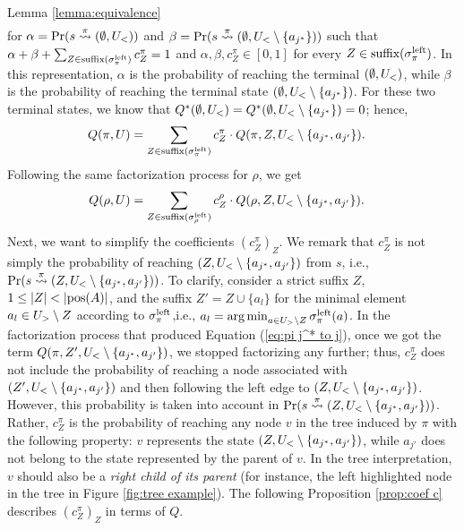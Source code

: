 \begin{proofof}{Lemma \ref{lemma:equivalence}}
\begin{align*}
\end{align*}
for $\alpha=\Pr(s\stackrel{\pi}{\rightsquigarrow}(\emptyset,U_<))$ and $\beta=\Pr(s\stackrel{\pi}{\rightsquigarrow}(\emptyset,U_<\setminus\{a_{j^*}\}))$ such that $\alpha+\beta+\sum_{Z\in \textnormal{suffix}(\sigma^{\textnormal{left}}_\pi)}c^\pi_Z =1$ and $\alpha,\beta,c^\pi_Z\in [0,1]$ for every $Z \in \textnormal{suffix}(\sigma^{\textnormal{left}}_\pi)$. In this representation, $\alpha$ is the probability of reaching the terminal $(\emptyset,U_<)$, while $\beta$ is the probability of reaching the terminal state $(\emptyset,U_<\setminus\{a_{j^*}\})$. For these two terminal states, we know that $Q^*(\emptyset,U_<)= Q^*(\emptyset,U_<\setminus \{a_{j^*} \})=0$; hence,
\begin{align}\label{eq:pi j^* to j}
Q(\pi,U) &= \sum_{Z \in \textnormal{suffix}(\sigma^{\textnormal{left}}_\pi)} c^\pi_Z \cdot Q(\pi,Z,U_<\setminus \{a_{j^*},a_{j'}\}).
\end{align}
Following the same factorization process for $\rho$, we get
\begin{align}\label{eq:rho j^* to j}
Q(\rho,U) &= \sum_{Z \in \textnormal{suffix}(\sigma^{\textnormal{left}}_\rho)} c^\rho_Z \cdot Q(\rho,Z,U_<\setminus \{a_{j^*},a_{j'}\}).
\end{align}
Next, we want to simplify the coefficients $\left(c^\pi_Z\right)_Z$. We remark that $c^\pi_Z$ is not simply the probability of reaching $(Z,U_<\setminus \{a_{j^*},a_{j'}\})$ from $s$, i.e., $\Pr(s\stackrel{\pi}{\rightsquigarrow}(Z,U_<\setminus \{a_{j^*},a_{j'}\}))$. To clarify, consider a strict suffix $Z$, $1\leq \left| Z \right|< \left| \textnormal{pos}(A) \right|$, and the suffix $Z'=Z \cup\{a_l\}$ for the minimal element $a_l \in U_> \setminus Z$ according to $\sigma^{\textnormal{left}}_\pi$,i.e., $a_l = \operatorname*{arg\,min}_{a\in U_> \setminus Z}\sigma^{\textnormal{left}}_\pi(a)$. In the factorization process that produced Equation (\ref{eq:pi j^* to j}), once we got the term $Q(\pi,Z',U_<\setminus \{a_{j^*},a_{j'}\})$, we stopped factorizing any further; thus, $c^\pi_Z$ does not include the probability of reaching a node associated with $(Z',U_<\setminus \{a_{j^*},a_{j'}\})$ and then following the left edge to $(Z,U_<\setminus \{a_{j^*},a_{j'}\})$. However, this probability is taken into account in $\Pr(s\stackrel{\pi}{\rightsquigarrow}(Z,U_<\setminus \{a_{j^*},a_{j'}\}))$. Rather, $c^\pi_Z$ is the probability of reaching any node $v$ in the tree induced by $\pi$ with the following property: $v$ represents the state $(Z,U_<\setminus \{a_{j^*},a_{j'}\})$, while $a_{j'}$ does not belong to the state represented by the parent of $v$.  In the tree interpretation, $v$ should also be a \textit{right child of its parent} (for instance, the left highlighted node in the tree in Figure \ref{fig:tree example}). The following Proposition \ref{prop:coef c} describes $\left(c^\pi_Z\right)_Z$ in terms of $Q$.

\end{proofof}
